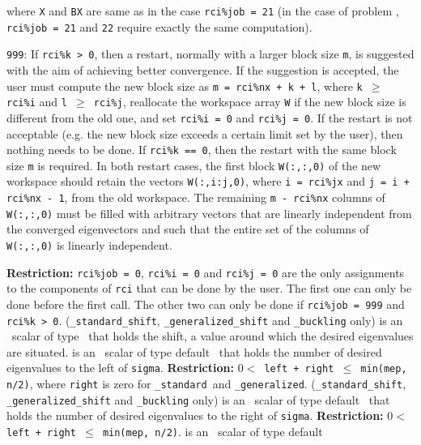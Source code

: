 \begin{description}
\begin{description}
where {\tt X} and {\tt BX} are same as in 
the case {\tt rci\%job = 21}
(in the case of problem ,
{\tt rci\%job = 21} and {\tt 22} 
require exactly the same computation).
%
\item
{\tt 999}: 
If {\tt rci\%k > 0}, then
a restart, normally with a larger block size {\tt m},
is suggested with the aim of achieving better convergence.
If the suggestion is accepted, the user must compute
the new block size as {\tt m = rci\%nx + k + l},
where {\tt k $\ge$ rci\%i} and {\tt l $\ge$ rci\%j},
reallocate the workspace array {\tt W}
if the new block size is different from the old one,
and set {\tt rci\%i = 0} and {\tt rci\%j = 0}.
If the restart is not acceptable
(e.g. the new block size exceeds a certain limit set by the user), 
then nothing needs to be done.
If {\tt rci\%k == 0}, then
the restart with the same block size {\tt m} is required.
In both restart cases,
the first block {\tt W(:,:,0)} of the new
workspace should retain the vectors 
{\tt W(:,i:j,0)},
where {\tt i = rci\%jx} and {\tt j = i + rci\%nx - 1},
from the old workspace.
The remaining {\tt m - rci\%nx} columns of {\tt W(:,:,0)}
must be filled
with arbitrary vectors that are linearly independent from 
the converged eigenvectors and such that
the entire set of the columns of {\tt W(:,:,0)}
is linearly independent.
%
\end{description}
%
{\bf Restriction:} 
{\tt rci\%job = 0}, 
{\tt rci\%i = 0} and
{\tt rci\%j = 0} 
are the only %
assignments to the components of {\tt rci}
that can be done
by the user.
The first one can only be done before the first call.
The other two can only be done if
{\tt rci\%job = 999} and {\tt rci\%k > 0}.
%
({\tt \solver\_standard\_shift}, {\tt \solver\_generalized\_shift}
and {\tt \solver\_buckling} only)
is an \intentin\ scalar of type \REALDP\
that holds the shift, 
a value around which the desired eigenvalues %
are situated.
%
 is an \intentin\ scalar of type default \Integer\ 
that holds the number of desired eigenvalues to the left of {\tt sigma}.
{\bf Restriction:} {\tt $0 < $ left + right $\le$ min(mep, n/2)},
where {\tt right} is zero for {\tt\solver\_standard}\ and 
{\tt\solver\_generalized}.
%
({\tt \solver\_standard\_shift}, {\tt \solver\_generalized\_shift}
and {\tt \solver\_buckling} only)
is an \intentin\ scalar of type default \Integer\ 
that holds the number of desired eigenvalues to the right of {\tt sigma}.
{\bf Restriction:} {\tt $0 < $ left + right $\le$ min(mep, n/2)}.
%
\itt{mep} is an \intentin\ scalar of type default \Integer\ 

\end{description}
